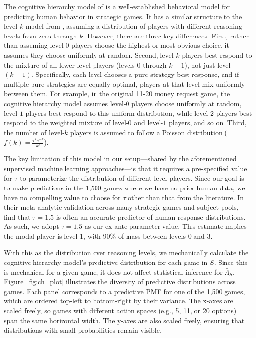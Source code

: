 \documentclass[11pt]{article}
\theoremstyle{definition}
\begin{document}
The cognitive hierarchy model of \cite{Camerer2004Cognitive} is a well-established behavioral model for predicting human behavior in strategic games. 
It has a similar structure to the level-$k$ model from \citeauthor{1120Arad2012}, assuming a distribution of players with different reasoning levels from zero through $k$. 
However, there are three key differences. 
First, rather than assuming level-$0$ players choose the highest or most obvious choice, it assumes they choose uniformly at random. 
Second, level-$k$ players best respond to the mixture of all lower-level players (levels $0$ through $k-1$), not just level-$(k-1)$. 
Specifically, each level chooses a pure strategy best response, and if multiple pure strategies are equally optimal, players at that level mix uniformly between them. 
For example, in the original 11-20 money request game, the cognitive hierarchy model assumes level-$0$ players choose uniformly at random, level-$1$ players best respond to this uniform distribution, while level-$2$ players best respond to the weighted mixture of level-$0$ and level-$1$ players, and so on.
Third, the number of level-$k$ players is assumed to follow a Poisson distribution ($f(k) = \frac{\tau^k e^{-\tau}}{k!}$).

The key limitation of this model in our setup---shared by the aforementioned supervised machine learning approaches---is that it requires a pre-specified value for $\tau$ to parameterize the distribution of different-level players.
Since our goal is to make predictions in the 1,500 games where we have no prior human data, we have no compelling value to choose for $\tau$ other than that from the literature.
In their meta-analytic validation across many strategic games and subject pools, \cite{Camerer2004Cognitive} find that $\tau = 1.5$ is often an accurate predictor of human response distributions.
As such, we adopt $\tau = 1.5$ as our ex ante parameter value.
This estimate implies the modal player is level-$1$, with 90\% of mass between levels $0$ and $3$.

With this as the distribution over reasoning levels, we mechanically calculate the cognitive hierarchy model's predictive distribution for each game in $S$.
Since this is mechanical for a given game, it does not affect statistical inference for $\bar\Lambda_{S}$.
Figure~\ref{fig:ch_plot} illustrates the diversity of predictive distributions across games.
Each panel corresponds to a predictive PMF for one of the 1,500 games, which are ordered top-left to bottom-right by their variance.
The x-axes are scaled freely, so games with different action spaces (e.g., 5, 11, or 20 options) span the same horizontal width. 
The y-axes are also scaled freely, ensuring that distributions with small probabilities remain visible.
\end{document}
